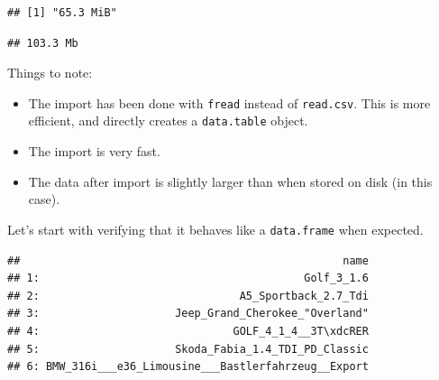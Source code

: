 \documentclass[]{book}
\newenvironment{Shaded}{\begin{snugshade}}{\end{snugshade}}
\newcommand{\KeywordTok}[1]{\textcolor[rgb]{0.13,0.29,0.53}{\textbf{#1}}}
\newcommand{\DataTypeTok}[1]{\textcolor[rgb]{0.13,0.29,0.53}{#1}}
\newcommand{\DecValTok}[1]{\textcolor[rgb]{0.00,0.00,0.81}{#1}}
\newcommand{\StringTok}[1]{\textcolor[rgb]{0.31,0.60,0.02}{#1}}
\newcommand{\CommentTok}[1]{\textcolor[rgb]{0.56,0.35,0.01}{\textit{#1}}}
\newcommand{\OperatorTok}[1]{\textcolor[rgb]{0.81,0.36,0.00}{\textbf{#1}}}
\newcommand{\NormalTok}[1]{#1}
\providecommand{\tightlist}{%
  \setlength{\itemsep}{0pt}\setlength{\parskip}{0pt}}
\theoremstyle{definition}
\theoremstyle{definition}
\theoremstyle{definition}
\theoremstyle{remark}
\begin{document}
\begin{verbatim}
## [1] "65.3 MiB"
\end{verbatim}

\begin{Shaded}
\end{Shaded}

\begin{verbatim}
## 103.3 Mb
\end{verbatim}

Things to note:

\begin{itemize}
\tightlist
\item
  The import has been done with \texttt{fread} instead of
  \texttt{read.csv}. This is more efficient, and directly creates a
  \texttt{data.table} object.
\item
  The import is very fast.
\item
  The data after import is slightly larger than when stored on disk (in
  this case).
\end{itemize}

Let's start with verifying that it behaves like a \texttt{data.frame}
when expected.

\begin{Shaded}
\end{Shaded}

\begin{verbatim}
##                                                  name
## 1:                                         Golf_3_1.6
## 2:                               A5_Sportback_2.7_Tdi
## 3:                     Jeep_Grand_Cherokee_"Overland"
## 4:                              GOLF_4_1_4__3T\xdcRER
## 5:                     Skoda_Fabia_1.4_TDI_PD_Classic
## 6: BMW_316i___e36_Limousine___Bastlerfahrzeug__Export
\end{verbatim}

\begin{Shaded}
\end{Shaded}
\end{document}
